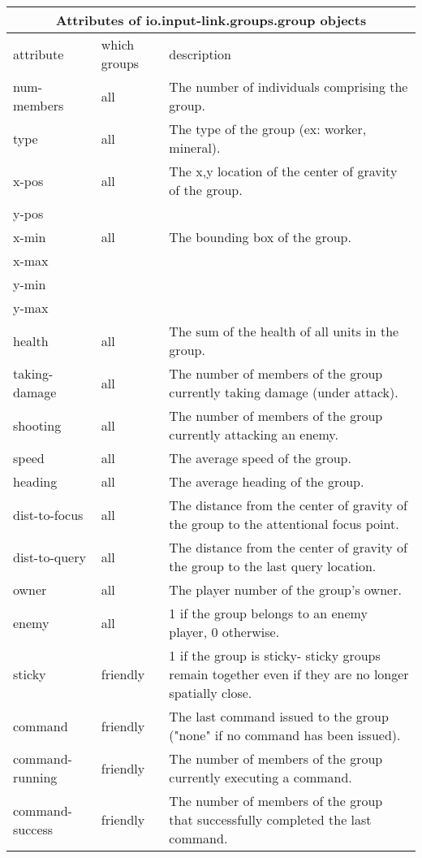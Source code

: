 \begin{center}
\begin{table}[h]
\begin{tabular}{|l|l|p{3.5in}|}
\hline
\multicolumn{3}{|c|}{\textbf{Attributes of io.input-link.groups.group objects}}\\ 
\hline
attribute  & which groups &  description\\
\hline \hline
num-members & all & The number of individuals comprising the group. \\
\hline
type & all &The type of the group (ex: worker, mineral). \\
\hline
x-pos & all &The x,y location of the center of gravity of the group.\\
y-pos & & \\
\hline
x-min & all &The bounding box of the group.\\
x-max & & \\
y-min & & \\
y-max & & \\
\hline
health & all &The sum of the health of all units in the group.\\
\hline
taking-damage & all &The number of members of the group currently taking damage (under attack). \\
\hline
shooting & all &The number of members of the group currently attacking an enemy. \\
\hline
speed & all &The average speed of the group. \\
\hline
heading & all &The average heading of the group. \\
\hline
dist-to-focus & all &The distance from the center of gravity of the group to the attentional focus point.\\
\hline
dist-to-query & all &The distance from the center of gravity of the group to the last query location.\\
\hline
owner & all &The player number of the group's owner.\\
\hline
enemy & all &1 if the group belongs to an enemy player, 0 otherwise.\\
\hline
sticky & friendly & 1 if the group is sticky- sticky groups remain together even if they are no longer spatially close.\\
\hline
command & friendly & The last command issued to the group ("none" if no command has been issued).\\
\hline
command-running & friendly & The number of members of the group currently executing a command.\\
\hline
command-success & friendly & The number of members of the group that successfully completed the last command.\\

\end{tabular}
\end{table}
\end{center}

